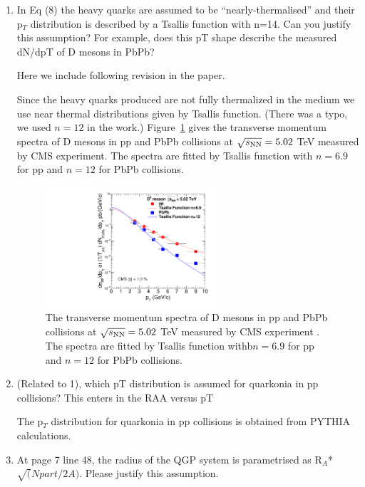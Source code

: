 \documentclass[a4paper,11pt]{article}
\begin{document}
\begin{enumerate}

\item In Eq (8) the heavy quarks are assumed to be “nearly-thermalised” and their p$_T$ distribution is described by a
  Tsallis function with n=14. Can you justify this assumption? For example, does this pT shape describe the measured dN/dpT
  of D mesons in PbPb?

{\color{blue}  Here we include following revision in the paper.
    
  Since the heavy quarks produced are not fully thermalized in the medium
  we use near thermal distributions given by Tsallis function.
  (There was a typo, we used $n=12$ in the work.)
  Figure~\ref{fig:Figure2_Tsallis} gives the transverse momentum spectra of D mesons in pp and PbPb collisions
  at $\sqrt{s_{\rm NN}}=5.02$ TeV measured by CMS experiment. The spectra are fitted
  by Tsallis function with $n=6.9$ for pp and $n=12$ for PbPb collisions.
}

\begin{figure}
  \includegraphics[width=0.60\textwidth]{Figure3_DMeson_502TeV.pdf}
  \caption{The transverse momentum spectra of D mesons in pp and PbPb collisions
    at $\sqrt{s_{\rm NN}}=5.02$ TeV measured by CMS experiment \cite{Sirunyan:2017xss}.
    The spectra are fitted
    by Tsallis function withb$n=6.9$ for pp and $n=12$ for PbPb collisions.
  }
  \label{fig:Figure2_Tsallis}
\end{figure}


\item (Related to 1), which pT distribution is assumed for quarkonia in pp collisions? This enters in the RAA versus pT

{\color{blue} The p$_T$ distribution for quarkonia in pp collisions is obtained from PYTHIA calculations. }



\item At page 7 line 48, the radius of the QGP system is parametrised as R$_A$*$\sqrt(Npart/2A)$. Please justify this assumption.\newline


\end{enumerate}
\end{document}
